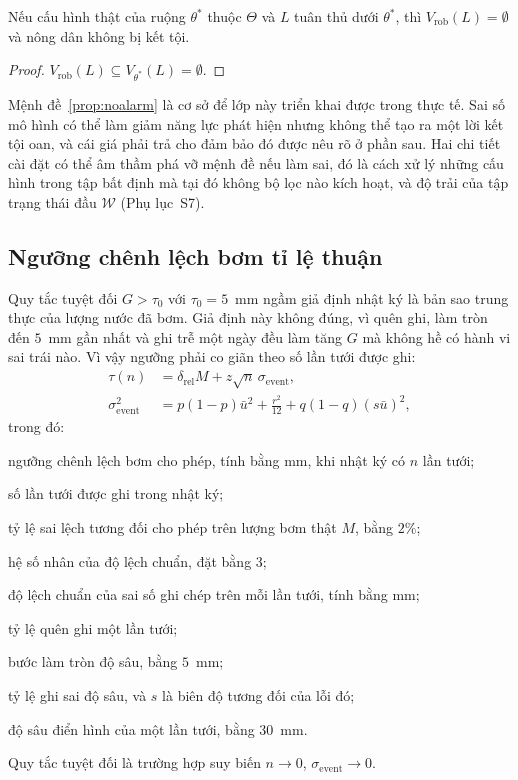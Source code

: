 \begin{proposition}
\label{prop:noalarm}
Nếu cấu hình thật của ruộng $\theta^{*}$ thuộc $\Theta$ và $L$ tuân thủ dưới
$\theta^{*}$, thì $V_{\mathrm{rob}}(L)=\emptyset$ và nông dân không bị kết tội.
\end{proposition}

\begin{proof}
$V_{\mathrm{rob}}(L)\subseteq V_{\theta^{*}}(L)=\emptyset$.
\end{proof}

Mệnh đề~\ref{prop:noalarm} là cơ sở để lớp này triển khai được trong thực tế. Sai
số mô hình có thể làm giảm năng lực phát hiện nhưng không thể tạo ra một lời kết
tội oan, và cái giá phải trả cho đảm bảo đó được nêu rõ ở phần sau. Hai chi tiết cài đặt có thể âm thầm phá vỡ mệnh đề nếu làm sai, đó là cách xử lý
những cấu hình trong tập bất định mà tại đó không bộ lọc nào kích hoạt, và độ trải
của tập trạng thái đầu $\mathcal{W}$ (Phụ lục~S7).

\subsection{Ngưỡng chênh lệch bơm tỉ lệ thuận}

Quy tắc tuyệt đối $G>\tau_0$ với $\tau_0=5$~mm ngầm giả định nhật ký là bản sao
trung thực của lượng nước đã bơm. Giả định này không đúng, vì quên ghi, làm tròn
đến $5$~mm gần nhất và ghi trễ một ngày đều làm tăng $G$ mà không hề có hành vi
sai trái nào. Vì vậy ngưỡng phải co giãn theo số lần tưới được ghi:
\begin{equation}
\begin{aligned}
\tau(n)&=\delta_{\mathrm{rel}}M+z\sqrt{n}\,\sigma_{\mathrm{event}},\\
\sigma_{\mathrm{event}}^{2}&=p(1-p)\bar u^{2}+\tfrac{r^{2}}{12}
+q(1-q)(s\bar u)^{2},
\end{aligned}
\label{eq:tau}
\end{equation}
trong đó:
\begin{symbolist}
\item[$\tau(n)$] ngưỡng chênh lệch bơm cho phép, tính bằng mm, khi nhật ký có $n$ lần tưới;
\item[$n$] số lần tưới được ghi trong nhật ký;
\item[$\delta_{\mathrm{rel}}$] tỷ lệ sai lệch tương đối cho phép trên lượng bơm thật $M$, bằng $2\%$;
\item[$z$] hệ số nhân của độ lệch chuẩn, đặt bằng $3$;
\item[$\sigma_{\mathrm{event}}$] độ lệch chuẩn của sai số ghi chép trên mỗi lần tưới, tính bằng mm;
\item[$p$] tỷ lệ quên ghi một lần tưới;
\item[$r$] bước làm tròn độ sâu, bằng $5$~mm;
\item[$q$] tỷ lệ ghi sai độ sâu, và $s$ là biên độ tương đối của lỗi đó;
\item[$\bar u$] độ sâu điển hình của một lần tưới, bằng $30$~mm.
\end{symbolist} Quy tắc tuyệt đối là trường hợp suy biến
$n\to0$, $\sigma_{\mathrm{event}}\to0$.

